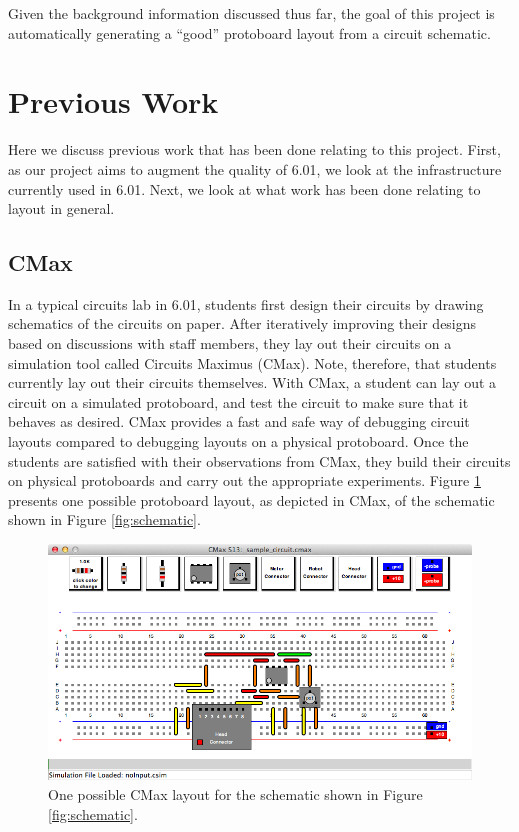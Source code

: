 Given the background information discussed thus far, the goal of this project is
automatically generating a ``good'' protoboard layout from a circuit schematic.

\section{Previous Work}

Here we discuss previous work that has been done relating to this project.
First, as our project aims to augment the quality of 6.01, we look at the
infrastructure currently used in 6.01. Next, we look at what work has
been done relating to layout in general.

\subsection{CMax}

In a typical circuits lab in 6.01, students first design their circuits by
drawing schematics of the circuits on paper.
After iteratively improving their designs based on discussions with staff
members, they lay out their circuits on a simulation tool called Circuits Maximus
(CMax)\cite{cmax}. Note, therefore, that students currently lay out their
circuits themselves.
With CMax, a student can lay out a circuit on a simulated protoboard, and test
the circuit to make sure that it behaves as desired. CMax provides a fast
and safe way of debugging circuit layouts compared to debugging layouts on a
physical protoboard. Once the students are satisfied with their
observations from CMax, they build their circuits on physical protoboards and
carry out the appropriate experiments. Figure \ref{fig:cmax_sample} presents one
possible protoboard layout, as depicted in CMax, of the schematic shown in
Figure \ref{fig:schematic}.

\begin{figure}
\begin{center}
\includegraphics[width=\textwidth]{Images/sample_circuit.png}
\caption[CMax]{One possible CMax layout for the schematic shown in Figure
\ref{fig:schematic}.}
\label{fig:cmax_sample}
\end{center}
\end{figure}


